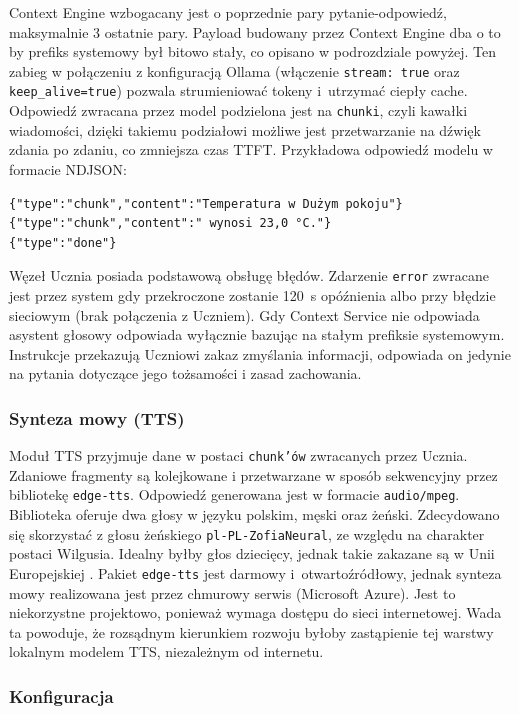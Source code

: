 Context Engine wzbogacany jest o poprzednie pary pytanie-odpowiedź, maksymalnie 3 ostatnie pary. Payload budowany przez Context Engine dba o to by prefiks systemowy był bitowo stały, co opisano w podrozdziale powyżej. Ten zabieg w połączeniu z konfiguracją Ollama (włączenie \texttt{stream: true} oraz
\texttt{keep\_alive=true}) pozwala strumieniować tokeny
i~utrzymać ciepły cache. Odpowiedź zwracana przez model podzielona jest na \texttt{chunki}, czyli kawałki wiadomości, dzięki takiemu podziałowi możliwe jest przetwarzanie na dźwięk zdania po zdaniu, co zmniejsza czas TTFT. Przykładowa odpowiedź modelu w formacie NDJSON:

\begin{verbatim}
{"type":"chunk","content":"Temperatura w Dużym pokoju"}
{"type":"chunk","content":" wynosi 23,0 °C."}
{"type":"done"}
\end{verbatim}


Węzeł Ucznia posiada podstawową obsługę błędów. Zdarzenie \texttt{error} zwracane jest przez system gdy przekroczone zostanie 120~s opóźnienia albo przy błędzie sieciowym (brak połączenia z Uczniem).
Gdy Context Service nie odpowiada asystent głosowy odpowiada wyłącznie bazując na stałym prefiksie systemowym. Instrukcje przekazują Uczniowi zakaz zmyślania informacji, odpowiada on jedynie na pytania dotyczące jego tożsamości i zasad zachowania.

\subsubsection{Synteza mowy (TTS)}

Moduł TTS przyjmuje dane w postaci \texttt{chunk'ów} zwracanych przez Ucznia. Zdaniowe fragmenty są kolejkowane i przetwarzane w sposób sekwencyjny przez bibliotekę \texttt{edge-tts}. Odpowiedź generowana jest w formacie \texttt{audio/mpeg}. Biblioteka oferuje dwa głosy w języku polskim, męski oraz żeński. Zdecydowano się skorzystać z głosu żeńskiego \texttt{pl-PL-ZofiaNeural}, ze względu na charakter postaci Wilgusia. Idealny byłby głos dziecięcy, jednak takie zakazane są w Unii Europejskiej \cite{EUAIAct2024}.
Pakiet \texttt{edge-tts} jest darmowy i~otwartoźródłowy, jednak synteza mowy realizowana jest przez chmurowy serwis (Microsoft Azure). Jest to niekorzystne projektowo, ponieważ wymaga dostępu do sieci internetowej. Wada ta powoduje, że rozsądnym kierunkiem rozwoju byłoby zastąpienie tej warstwy lokalnym modelem TTS, niezależnym od internetu.

\subsubsection{Konfiguracja}


